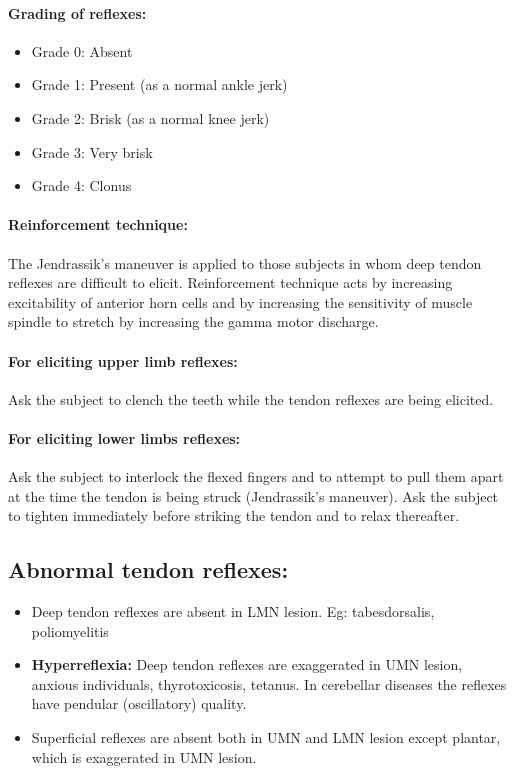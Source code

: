 \documentclass[a4paper,12pt,openany,twoside]{book}
\begin{document}
\paragraph{Grading of reflexes:}
\begin{itemize}
		\itemsep0em
\item[]Grade 0: Absent
\item[]Grade 1: Present (as a normal ankle jerk)
\item[]Grade 2: Brisk (as a normal knee jerk)
\item[]Grade 3: Very brisk
\item[]Grade 4: Clonus
\end{itemize}
\paragraph{Reinforcement technique:}
The Jendrassik's maneuver is applied to those subjects in whom deep tendon reflexes are difficult to elicit. Reinforcement technique acts by increasing excitability of anterior horn cells and by increasing the sensitivity of muscle spindle to stretch by increasing the gamma motor discharge.
\paragraph{For eliciting upper limb reflexes:}
	Ask the subject to clench the teeth while the tendon reflexes are being elicited.
\paragraph{For eliciting lower limbs reflexes:}
Ask the subject to interlock the flexed fingers and to attempt to pull them apart at the time the tendon is being struck (Jendrassik's maneuver). Ask the subject to tighten immediately before striking the tendon and to relax thereafter.
\subsection*{Abnormal tendon reflexes:}
\begin{itemize}
		\itemsep0em
\item{Deep tendon reflexes are absent in LMN lesion. Eg: tabesdorsalis, poliomyelitis}
\item{\textbf{Hyperreflexia:} Deep tendon reflexes are exaggerated in UMN lesion, anxious individuals, thyrotoxicosis, tetanus. In cerebellar diseases the reflexes have pendular (oscillatory) quality.}
\item{Superficial reflexes are absent both in UMN and LMN lesion except plantar, which is exaggerated in UMN lesion.}
\end{itemize}
\end{document}
